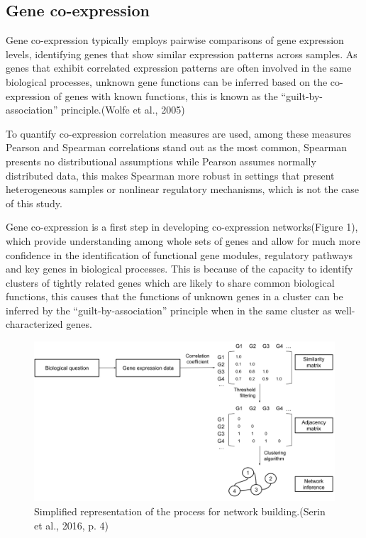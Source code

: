 \documentclass[
]{article}
\begin{document}
\hypertarget{gene-co-expression}{%
\subsection{Gene co-expression}\label{gene-co-expression}}

Gene co-expression typically employs pairwise comparisons of gene
expression levels, identifying genes that show similar expression
patterns across samples. As genes that exhibit correlated expression
patterns are often involved in the same biological processes, unknown
gene functions can be inferred based on the co-expression of genes with
known functions, this is known as the ``guilt-by-association''
principle.(Wolfe et al., 2005)

To quantify co-expression correlation measures are used, among these
measures Pearson and Spearman correlations stand out as the most common,
Spearman presents no distributional assumptions while Pearson assumes
normally distributed data, this makes Spearman more robust in settings
that present heterogeneous samples or nonlinear regulatory mechanisms,
which is not the case of this study.

Gene co-expression is a first step in developing co-expression
networks(Figure 1), which provide understanding among whole sets of
genes and allow for much more confidence in the identification of
functional gene modules, regulatory pathways and key genes in biological
processes. This is because of the capacity to identify clusters of
tightly related genes which are likely to share common biological
functions, this causes that the functions of unknown genes in a cluster
can be inferred by the ``guilt-by-association'' principle when in the
same cluster as well-characterized genes.
 

\begin{figure}[H]
	\centering
	\includegraphics[width=1\linewidth]{figures/Final_networkProcess.png}
	\caption[Network Diagram]{\small Simplified representation of the process for network building.(Serin et al., 2016, p. 4)}
	\label{fig:Netw_diagram}
\end{figure}
\end{document}
